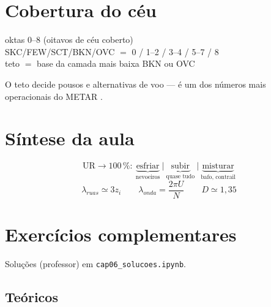 \documentclass[11pt]{article}
\begin{document}
\section{Cobertura do céu}

\begin{noquadro}
oktas 0--8 (oitavos de céu coberto)\\
SKC/FEW/SCT/BKN/OVC $=$ 0 / 1--2 / 3--4 / 5--7 / 8\\
teto $=$ base da camada mais baixa BKN ou OVC
\end{noquadro}

O teto decide pousos e alternativas de voo — é um dos números mais
operacionais do METAR .

\section{Síntese da aula}

\begin{noquadro}
\[ \text{UR}\to100\,\%:\
\underbrace{\text{esfriar}}_{\text{nevoeiros}}\ \big|\
\underbrace{\text{subir}}_{\text{quase tudo}}\ \big|\
\underbrace{\text{misturar}}_{\text{bafo, contrail}} \]
\[ \lambda_{ruas}\simeq 3z_i \qquad \lambda_{onda} = \frac{2\pi U}{N}
\qquad D \simeq 1{,}35 \]
\end{noquadro}

\section{Exercícios complementares}\label{sec:exercicios}

Soluções (professor) em \texttt{cap06\_solucoes.ipynb}.

\subsection*{Teóricos}
\end{document}
